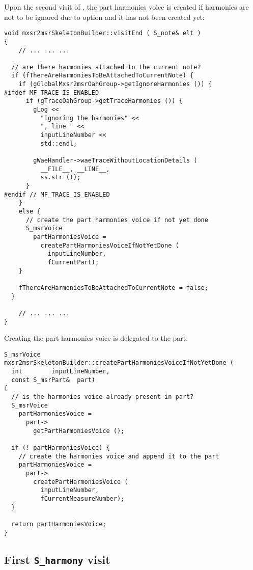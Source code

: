 Upon the second visit of , the part harmonies voice is created if harmonies are not to be ignored due to option  and it has not been created yet:
\begin{lstlisting}[language=CPlusPlus]
void mxsr2msrSkeletonBuilder::visitEnd ( S_note& elt )
{
	// ... ... ...

  // are there harmonies attached to the current note?
  if (fThereAreHarmoniesToBeAttachedToCurrentNote) {
    if (gGlobalMxsr2msrOahGroup->getIgnoreHarmonies ()) {
#ifdef MF_TRACE_IS_ENABLED
      if (gTraceOahGroup->getTraceHarmonies ()) {
        gLog <<
          "Ignoring the harmonies" <<
          ", line " <<
          inputLineNumber <<
          std::endl;

        gWaeHandler->waeTraceWithoutLocationDetails (
          __FILE__, __LINE__,
          ss.str ());
      }
#endif // MF_TRACE_IS_ENABLED
    }
    else {
      // create the part harmonies voice if not yet done
      S_msrVoice
        partHarmoniesVoice =
          createPartHarmoniesVoiceIfNotYetDone (
            inputLineNumber,
            fCurrentPart);
    }

    fThereAreHarmoniesToBeAttachedToCurrentNote = false;
  }

	// ... ... ...
}
\end{lstlisting}

Creating the part harmonies voice is delegated to the part:
\begin{lstlisting}[language=CPlusPlus]
S_msrVoice mxsr2msrSkeletonBuilder::createPartHarmoniesVoiceIfNotYetDone (
  int        inputLineNumber,
  const S_msrPart&  part)
{
  // is the harmonies voice already present in part?
  S_msrVoice
    partHarmoniesVoice =
      part->
        getPartHarmoniesVoice ();

  if (! partHarmoniesVoice) {
    // create the harmonies voice and append it to the part
    partHarmoniesVoice =
      part->
        createPartHarmoniesVoice (
          inputLineNumber,
          fCurrentMeasureNumber);
  }

  return partHarmoniesVoice;
}
\end{lstlisting}


\subsection{First {\tt S_harmony} visit}

